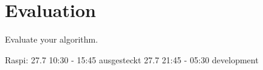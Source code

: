 \chapter{Evaluation}
\label{sec:evaluation}

Evaluate your algorithm.

Raspi: 27.7 10:30 - 15:45 ausgesteckt
27.7 21:45 - 05:30 development